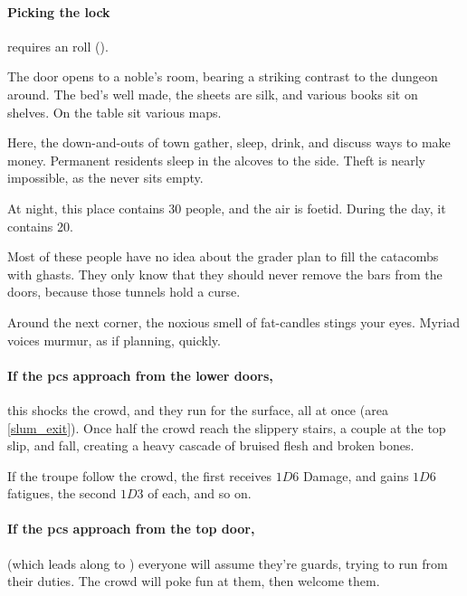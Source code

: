 \showTalisman

\paragraph{Picking the lock}
requires an  roll (\tn[9]).

\begin{boxtext}
  The door opens to a noble's room, bearing a striking contrast to the dungeon around.
  The bed's well made, the sheets are silk, and various books sit on shelves.
  On the table sit various maps.
\end{boxtext}


Here, the down-and-outs of \gls{town} gather, sleep, drink, and discuss ways to make money.
Permanent residents sleep in the alcoves to the side.
Theft is nearly impossible, as the  never sits empty.

At night, this place contains 30 people, and the air is foetid.
During the day, it contains 20.

Most of these people have no idea about the grader plan to fill the catacombs with ghasts.
They only know that they should never remove the bars from the doors, because those tunnels hold a curse.

\begin{boxtext}
  Around the next corner, the noxious smell of fat-candles stings your eyes.
  Myriad voices murmur, as if planning, quickly.
\end{boxtext}

\paragraph{If the \glspl{pc} approach from the lower doors,}
this shocks the crowd, and they run for the surface, all at once (\gls{area} \vref{slum_exit}).
Once half the crowd reach the slippery stairs, a couple at the top slip, and fall, creating a heavy cascade of bruised flesh and broken bones.

If the troupe follow the crowd, the first receives $1D6$ Damage, and gains $1D6$ \glspl{fatigue}, the second $1D3$ of each, and so on.

\paragraph{If the \glspl{pc} approach from the top door,}
(which leads along to ) everyone will assume they're \glspl{guard}, trying to run from their duties.
The crowd will poke fun at them, then welcome them.


